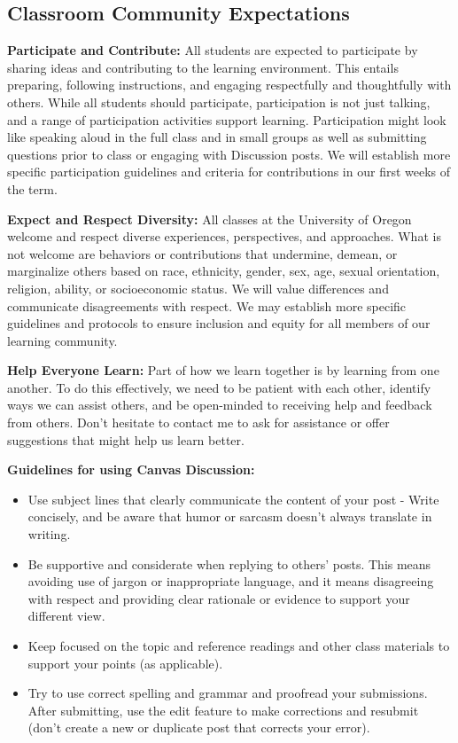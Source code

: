 \documentclass[
  letterpaper,
  DIV=11,
  numbers=noendperiod]{scrartcl}
\providecommand{\tightlist}{%
  \setlength{\itemsep}{0pt}\setlength{\parskip}{0pt}}\usepackage{longtable,booktabs,array}
\begin{document}
\hypertarget{classroom-community-expectations}{%
\subsection{Classroom Community
Expectations}\label{classroom-community-expectations}}

\textbf{Participate and Contribute:} All students are expected to
participate by sharing ideas and contributing to the learning
environment. This entails preparing, following instructions, and
engaging respectfully and thoughtfully with others. While all students
should participate, participation is not just talking, and a range of
participation activities support learning. Participation might look like
speaking aloud in the full class and in small groups as well as
submitting questions prior to class or engaging with Discussion posts.
We will establish more specific participation guidelines and criteria
for contributions in our first weeks of the term.

\textbf{Expect and Respect Diversity:} All classes at the University of
Oregon welcome and respect diverse experiences, perspectives, and
approaches. What is not welcome are behaviors or contributions that
undermine, demean, or marginalize others based on race, ethnicity,
gender, sex, age, sexual orientation, religion, ability, or
socioeconomic status. We will value differences and communicate
disagreements with respect. We may establish more specific guidelines
and protocols to ensure inclusion and equity for all members of our
learning community.

\textbf{Help Everyone Learn:} Part of how we learn together is by
learning from one another. To do this effectively, we need to be patient
with each other, identify ways we can assist others, and be open-minded
to receiving help and feedback from others. Don't hesitate to contact me
to ask for assistance or offer suggestions that might help us learn
better.

\textbf{Guidelines for using Canvas Discussion:}

\begin{itemize}
\tightlist
\item
  Use subject lines that clearly communicate the content of your post -
  Write concisely, and be aware that humor or sarcasm doesn't always
  translate in writing.
\item
  Be supportive and considerate when replying to others' posts. This
  means avoiding use of jargon or inappropriate language, and it means
  disagreeing with respect and providing clear rationale or evidence to
  support your different view.\\
\item
  Keep focused on the topic and reference readings and other class
  materials to support your points (as applicable).\\
\item
  Try to use correct spelling and grammar and proofread your
  submissions. After submitting, use the edit feature to make
  corrections and resubmit (don't create a new or duplicate post that
  corrects your error).
\end{itemize}
\end{document}
